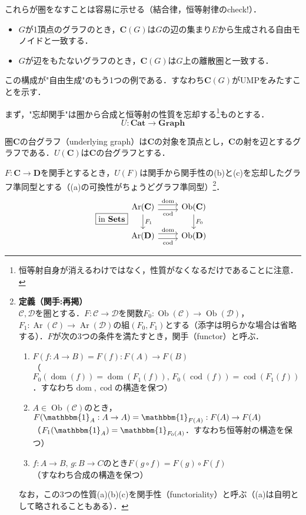 \documentclass[dvipdfmx,a4j,10pt]{jsarticle}
\theoremstyle{mystyle1}
\theoremstyle{mystyle2}
\renewcommand{\labelenumi}{\ensuremath{\blacksquare}}
\renewcommand{\labelenumi}{(\arabic{enumi})}%
\DeclareMathOperator{\Ob}{Ob}
\DeclareMathOperator{\Ar}{Ar}
\DeclareMathOperator{\dom}{dom}
\DeclareMathOperator{\cod}{cod}
\newcommand{\Sets}{\mathbf{Sets}}
\newcommand{\Cat}{\mathbf{Cat}}
\newcommand{\Graph}{\mathbf{Graph}}
\begin{document}
これらが圏をなすことは容易に示せる（結合律，恒等射律のcheck!）．

\begin{itemize}
	\item $G$が1頂点のグラフのとき，$\textbf{C}(G)$は$G$の辺の集まり$E$から生成される自由モノイドと一致する．
	\item $G$が辺をもたないグラフのとき，$\textbf{C}(G)$は$G$上の離散圏と一致する．
\end{itemize}


この構成が"自由生成"のもう1つの例である．すなわち$\mathbf{C}(G)$がUMPをみたすことを示す．

まず，"忘却関手"は圏から合成と恒等射の性質を忘却する\footnote{恒等射自身が消えるわけではなく，性質がなくなるだけであることに注意．}ものとする．
\[
	U:\Cat\to \Graph
\]


圏$\mathbf{C}$の台グラフ（underlying graph）は$\mathbf{C}$の対象を頂点とし，$\mathbf{C}$の射を辺とするグラフである．$U(\mathbf{C})$は$\mathbf{C}$の台グラフとする．


$F:\mathbf{C}\to \mathbf{D}$を関手とするとき，$U(F)$は関手から関手性の(b)と(c)を忘却したグラフ準同型とする（(a)の可換性がちょうどグラフ準同型）\footnote{
	\textbf{定義（関手:再掲）}\\
	$\mathcal{C},\mathcal{D}$を圏とする．$F:\mathcal{C}\to\mathcal{D}$を関数$F_0:\Ob(\mathcal{C})\to\Ob(\mathcal{D})$，$F_1:\Ar(\mathcal{C})\to\Ar(\mathcal{D})$の組$(F_0,F_1)$とする（添字は明らかな場合は省略する）．$F$が次の3つの条件を満たすとき，関手（functor）と呼ぶ．
	\begin{enumerate}\renewcommand{\labelenumi}{(\alph{enumi})}
		\item $F(f:A\to B)=F(f):F(A)\to F(B)$\\
		      （$F_0(\dom(f))=\dom(F_1(f)),\,F_0(\cod(f))=\cod(F_1(f))$．すなわち$\dom,\cod$の構造を保つ）
		\item $A\in\Ob(\mathcal{C})$のとき，$F(\mathbbm{1}_A:A\to A)=\mathbbm{1}_{F(A)}:F(A)\to F(A)$\\
		      （$F_1(\mathbbm{1}_A)=\mathbbm{1}_{F_0(A)}$．すなわち恒等射の構造を保つ）
		\item $f:A\to B,\, g:B\to C$のとき$F(g\circ f)=F(g)\circ F(f)$\\
		      （すなわち合成の構造を保つ）
	\end{enumerate}
	なお，この3つの性質(a)(b)(c)を関手性（functoriality）と呼ぶ（(a)は自明として略されることもある）．
}．
\begin{equation}
	\fbox{in $\Sets$}
	\begin{tikzcd}
		\Ar(\mathbf{C}) \arrow[r,yshift=0.7ex,"\dom"] \arrow[r,yshift=-0.7ex,"\cod"'] \arrow[d,"F_1"] & \Ob(\mathbf{C}) \arrow[d,"F_0"]\\
		\Ar(\mathbf{D}) \arrow[r,yshift=0.7ex,"\dom"] \arrow[r,yshift=-0.7ex,"\cod"'] & \Ob(\mathbf{D})
	\end{tikzcd}
\end{equation}
\end{document}
